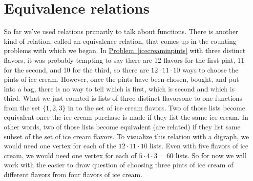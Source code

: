 \documentclass[10pt,]{book}
\theoremstyle{plain}
\theoremstyle{definition}
\theoremstyle{definition}
\numberwithin{equation}{chapter}
\begin{document}
\section[{Equivalence relations}]{Equivalence relations}\label{equivalencerelations}
So far we've used relations primarily to talk about functions. There is another kind of relation, called an equivalence relation, that comes up in the counting problems with which we began. In \hyperref[icecreaminpints]{Problem~\ref{icecreaminpints}} with three distinct flavors, it was probably tempting to say there are 12 flavors for the first pint, 11 for the second, and 10 for the third, so there are \(12\cdot 11\cdot 10\) ways to choose the pints of ice cream. However, once the pints have been chosen, bought, and put into a bag, there is no way to tell which is first, which is second and which is third. What we just counted is lists of three distinct flavors\textemdash{}one to one functions from the set \(\{1,2,3\}\) in to the set of ice cream flavors. Two of those lists become equivalent once the ice cream purchase is made if they list the same ice cream. In other words, two of those lists become equivalent (are related) if they list same subset of the set of ice cream flavors. To visualize this relation with a digraph, we would need one vertex for each of the \(12\cdot 11\cdot 10\) lists. Even with five flavors of ice cream, we would need one vertex for each of \(5\cdot4\cdot3=60\) lists. So for now we will work with the easier to draw question of choosing three pints of ice cream of different flavors from four flavors of ice cream.%
\end{document}

